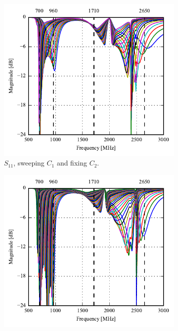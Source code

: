 \begin{figure}[htbp]
   \begin{subfigure}[b]{0.49\linewidth}
        \centering
        \includegraphics{img/tech_sol/monopole/highband/sim/s11.pdf}
        \caption{$S_{11}$, sweeping $C_1$ and fixing $C_2$.}
   \end{subfigure}
    \hfill
    \begin{subfigure}[b]{0.49\linewidth}
        \centering
        \includegraphics{img/tech_sol/monopole/highband/sim/s22.pdf}

\end{subfigure}
\end{figure}
